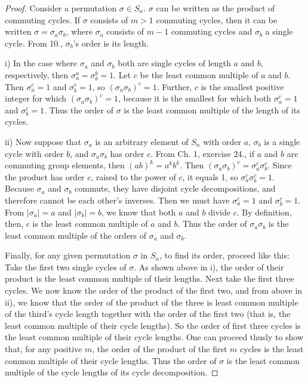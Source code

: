\documentclass{article}
\begin{document}
\begin{proof}
    Consider a permutation $\sigma \in S_n$. $\sigma$ can be written as the product of commuting cycles. If $\sigma$ consists of $m > 1$ commuting cycles, then it can be written $\sigma = \sigma_a \sigma_b$, where $\sigma_a$ consists of $m - 1$ commuting cycles and $\sigma_b$ a single cycle. From 10., $\sigma_b$'s order is its length.

    i) In the case where $\sigma_a$ and $\sigma_b$ both are single cycles of length $a$ and $b$, respectively, then $\sigma_a^a = \sigma_b^b = 1$. Let $c$ be the least common multiple of $a$ and $b$. Then $\sigma_a^c = 1$ and $\sigma_b^c = 1$, so $(\sigma_a \sigma_b)^c = 1$. Further, $c$ is the smallest positive integer for which $(\sigma_a \sigma_b)^c = 1$, because it is the smallest for which both $\sigma_a^c = 1$ and $\sigma_b^c = 1$. Thus the order of $\sigma$ is the least common multiple of the length of its cycles.
    
    ii) Now suppose that $\sigma_a$ is an arbitrary element of $S_n$ with order $a$, $\sigma_b$ is a single cycle with order $b$, and $\sigma_a \sigma_b$ has order $c$. From Ch. 1, exercise 24., if $a$ and $b$ are commuting group elements, then $(ab)^k = a^k b^k$. Then $(\sigma_a \sigma_b)^c = \sigma_a^c \sigma_b^c$. Since the product has order $c$, raised to the power of $c$, it equals 1, so $\sigma_a^c \sigma_b^c = 1$. Because $\sigma_a$ and $\sigma_b$ commute, they have disjoint cycle decompositions, and therefore cannot be each other's inverses. Then we must have $\sigma_a^c = 1$ and $\sigma_b^c = 1$. From $|\sigma_a| = a$ and $|\sigma_b| = b$, we know that both $a$ and $b$ divide $c$. By definition, then, $c$ is the least common multiple of $a$ and $b$. Thus the order of $\sigma_a \sigma_b$ is the least common multiple of the orders of $\sigma_a$ and $\sigma_b$.

    Finally, for any given permutation $\sigma$ in $S_n$, to find its order, proceed like this: Take the first two single cycles of $\sigma$. As shown above in i), the order of their product is the least common multiple of their lengths. Next take the first three cycles. We now know the order of the product of the first two, and from above in ii), we know that the order of the product of the three is least common multiple of the third's cycle length together with the order of the first two (that is, the least common multiple of their cycle lengths). So the order of first three cycles is the least common multiple of their cycle lengths. One can proceed thusly to show that, for any positive $m$, the order of the product of the first $m$ cycles is the least common multiple of their cycle lengths. Thus the order of $\sigma$ is the least common multiple of the cycle lengths of its cycle decomposition.
\end{proof}
\end{document}
